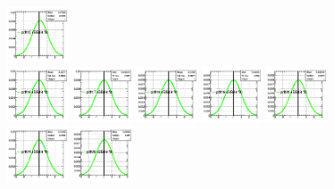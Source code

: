 \begin{spacing}{2}
\begin{figure}[!htbp]
{{\includegraphics[width=0.16\textwidth]{fig/posteriors__pdf15_BB18_fitBBBE161718_ADDGRW.png}\\
\includegraphics[width=0.16\textwidth]{fig/posteriors__pdf16_BB18_fitBBBE161718_ADDGRW.png}
\includegraphics[width=0.16\textwidth]{fig/posteriors__pdf17_BB18_fitBBBE161718_ADDGRW.png}
\includegraphics[width=0.16\textwidth]{fig/posteriors__pdf18_BB18_fitBBBE161718_ADDGRW.png}
\includegraphics[width=0.16\textwidth]{fig/posteriors__pdf19_BB18_fitBBBE161718_ADDGRW.png}
\includegraphics[width=0.16\textwidth]{fig/posteriors__pdf20_BB18_fitBBBE161718_ADDGRW.png}\\
\includegraphics[width=0.16\textwidth]{fig/posteriors__pdf21_BB18_fitBBBE161718_ADDGRW.png}
\includegraphics[width=0.16\textwidth]{fig/posteriors__pdf22_BB18_fitBBBE161718_ADDGRW.png}
}}
\end{figure}
\end{spacing}
